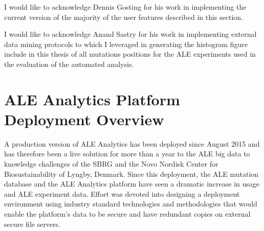 \documentclass[12pt,final,masters,chapterheads]{ucsd}  %
\begin{document}


\clearpage
I would like to acknowledge Dennis Gosting for his work in implementing the current version of the majority of the user features described in this section.

I would like to acknowledge Anand Sastry for his work in implementing external data mining protocols to which I leveraged in generating the histogram figure include in this thesis of all mutations positions for the ALE experiments used in the evaluation of the automated analysis.
\clearpage
\section{ALE Analytics Platform Deployment Overview}
A production version of ALE Analytics has been deployed since August 2015 and has therefore been a live solution for more than a year to the ALE big data to knowledge challenges of the SBRG and the Novo Nordisk Center for Biosustainability of Lyngby, Denmark. Since this deployment, the ALE mutation database and the ALE Analytics platform have seen a dramatic increase in usage and ALE experiment data. Effort was devoted into designing a deployment environment using industry standard technologies and methodologies that would enable the platform's data to be secure and have redundant copies on external secure file servers.
\end{document}

